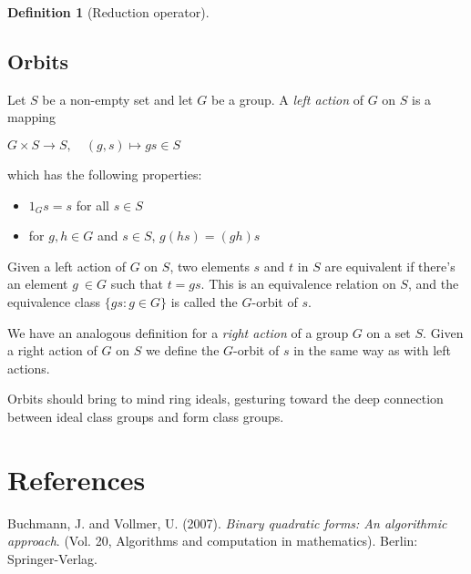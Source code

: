 \documentclass{article}
\theoremstyle{definition}
\newtheorem{definition}{Definition}[section]
\theoremstyle{theorem}
\theoremstyle{example}
\theoremstyle{corollary}
\begin{document}
\begin{definition}[Reduction operator]
\bigskip

\subsection{Orbits}

\bigskip

Let \(S\) be a non-empty set and let \(G\) be a group. A \textit{left action} of \(G\) on \(S\) is a mapping
\begin{center}
\(G \times S \rightarrow S, \quad (g, s) \mapsto gs \in S\)
\end{center}
which has the following properties:
\begin{itemize}
\item \(1_{G} s = s\) for all \(s \in S\)
\item for \(g, h \in G\) and \(s \in S\), \(g(hs) = (gh)s\)
\end{itemize}

\bigskip

Given a left action of \(G\) on \(S\), two elements \(s\) and \(t\) in \(S\) are equivalent if there's an element \(g \ \in G\) such that \(t = gs\). This is an equivalence relation on \(S\), and the equivalence class \(\{gs : g \in G \}\) is called the \(G\)-orbit of \(s\).

\bigskip

We have an analogous definition for a \textit{right action} of a group \(G\) on a set \(S\). Given a right action of \(G\) on \(S\) we define the \(G\)-orbit of \(s\) in the same way as with left actions.

\bigskip

Orbits should bring to mind ring ideals, gesturing toward the deep connection between ideal class groups and form class groups.








\newpage






\section*{References}

\bigskip
\bigskip

Buchmann, J. and Vollmer, U. (2007). \textit{Binary quadratic forms: An algorithmic approach}. (Vol. 20, Algorithms and computation in mathematics). Berlin: Springer-Verlag.


\end{definition}
\end{document}
